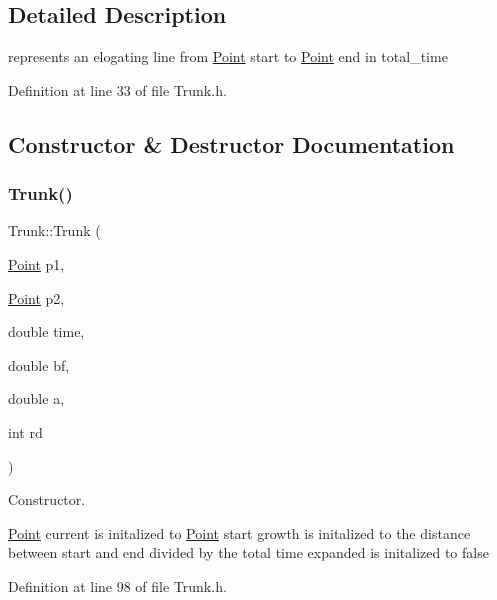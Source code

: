 \subsection{Detailed Description}
represents an elogating line from \mbox{\hyperlink{struct_point}{Point}} start to \mbox{\hyperlink{struct_point}{Point}} end in total\+\_\+time 

Definition at line 33 of file Trunk.\+h.



\subsection{Constructor \& Destructor Documentation}
\mbox{\label{class_trunk_a01d439d00e7e118af0f6e33626e773d1}} 
\subsubsection{\texorpdfstring{Trunk()}{Trunk()}}
{\footnotesize\ttfamily Trunk\+::\+Trunk (\begin{DoxyParamCaption}\item[{\mbox{\hyperlink{struct_point}{Point}}}]{p1,  }\item[{\mbox{\hyperlink{struct_point}{Point}}}]{p2,  }\item[{double}]{time,  }\item[{double}]{bf,  }\item[{double}]{a,  }\item[{int}]{rd }\end{DoxyParamCaption})\hspace{0.3cm}{\ttfamily [inline]}}



Constructor. 

\mbox{\hyperlink{struct_point}{Point}} current is initalized to \mbox{\hyperlink{struct_point}{Point}} start growth is initalized to the distance between start and end divided by the total time expanded is initalized to false 

Definition at line 98 of file Trunk.\+h.


\begin{DoxyCode}{0}

\end{DoxyCode}


